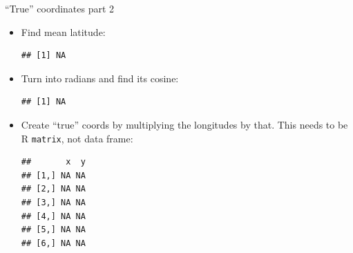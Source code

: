 \begin{frame}[fragile]{``True'' coordinates part 2}
  
  \begin{itemize}
  \item Find mean latitude:
\begin{knitrout}
\color{fgcolor}\begin{kframe}
\begin{alltt}
\hlkwb{=}\hlopt{$}
\end{alltt}
\begin{verbatim}
## [1] NA
\end{verbatim}
\end{kframe}
\end{knitrout}

\item Turn into radians and find its cosine:
  
\begin{knitrout}
\color{fgcolor}\begin{kframe}
\begin{alltt}
\hlkwb{=}\hlopt{*}\hlopt{/}
\end{alltt}
\begin{verbatim}
## [1] NA
\end{verbatim}
\end{kframe}
\end{knitrout}

\item Create ``true'' coords by multiplying the longitudes by
  that. This needs to be R \texttt{matrix}, not data frame:
  
\begin{knitrout}\footnotesize
{}\color{fgcolor}\begin{kframe}
\begin{alltt}
\hlkwb{=}\hlstd{(}\hlopt{*}
\end{alltt}
\begin{verbatim}
##       x  y
## [1,] NA NA
## [2,] NA NA
## [3,] NA NA
## [4,] NA NA
## [5,] NA NA
## [6,] NA NA
\end{verbatim}
\end{kframe}
\end{knitrout}
  \end{itemize}
  
\end{frame}

